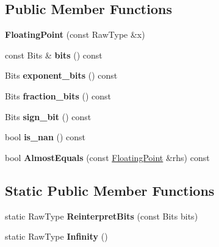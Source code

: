\subsection*{Public Member Functions}
\begin{DoxyCompactItemize}
\item 
\mbox{\label{classtesting_1_1internal_1_1_floating_point_a0dabf840863e0df84046f171c891fe71}} 
{\bfseries Floating\+Point} (const Raw\+Type \&x)
\item 
\mbox{\label{classtesting_1_1internal_1_1_floating_point_aab053be914bdc9e507c0db89740c318c}} 
const Bits \& {\bfseries bits} () const
\item 
\mbox{\label{classtesting_1_1internal_1_1_floating_point_af6bf8fab8df572ecb137a3516ff390ae}} 
Bits {\bfseries exponent\+\_\+bits} () const
\item 
\mbox{\label{classtesting_1_1internal_1_1_floating_point_aa17337e50a2ac855719bc0676529558f}} 
Bits {\bfseries fraction\+\_\+bits} () const
\item 
\mbox{\label{classtesting_1_1internal_1_1_floating_point_afb8a816bb598225d775caaf43a893ef0}} 
Bits {\bfseries sign\+\_\+bit} () const
\item 
\mbox{\label{classtesting_1_1internal_1_1_floating_point_a1fc654fd206efa98e480aa1e034f30d5}} 
bool {\bfseries is\+\_\+nan} () const
\item 
\mbox{\label{classtesting_1_1internal_1_1_floating_point_a965214c1af2f9ac5adb1393794aa81e5}} 
bool {\bfseries Almost\+Equals} (const \mbox{\hyperlink{classtesting_1_1internal_1_1_floating_point}{Floating\+Point}} \&rhs) const
\end{DoxyCompactItemize}
\subsection*{Static Public Member Functions}
\begin{DoxyCompactItemize}
\item 
\mbox{\label{classtesting_1_1internal_1_1_floating_point_ac551f793522e54fbd8a25acb79eac5b1}} 
static Raw\+Type {\bfseries Reinterpret\+Bits} (const Bits bits)
\item 
\mbox{\label{classtesting_1_1internal_1_1_floating_point_a460027cc19cf01ae8e09cc3796b2b575}} 
static Raw\+Type {\bfseries Infinity} ()
\end{DoxyCompactItemize}
